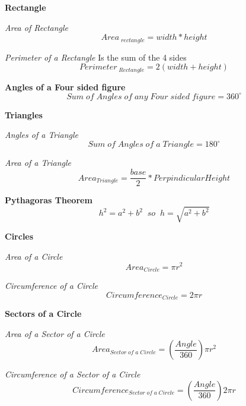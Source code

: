 \documentclass{article}
\begin{document}
\textbf{Rectangle}

\textit{Area of Rectangle}
\begin{equation}
Area_{\;rectangle} = width * height
\end{equation}

\textit{Perimeter of a Rectangle}
Is the sum of the 4 sides
\begin{equation}
Perimeter_{\;Rectangle} = 2 ( width + height )
\end{equation}

\textbf{Angles of a Four sided figure}
\begin{equation}
Sum\;of\;Angles\;of\;any\;Four\; sided\; figure = 360^\circ
\end{equation}

\textbf{Triangles}

\textit{Angles of a Triangle}
\begin{equation}
Sum\;of\;Angles\;of\;a\;Triangle = 180^\circ
\end{equation}

\textit{Area of a Triangle}
\begin{equation}
Area_{Triangle} = \frac{base}{2} * Perpindicular Height
\end{equation}

\textbf{Pythagoras Theorem}
\begin{equation}
h^2 = a^2 + b^2 \;\;so \;\;h= \sqrt{a^2 + b^2}
\end{equation}

\textbf{Circles}

\textit{Area of a Circle}
\begin{equation}
Area_{ Circle} = \pi r^ 2
\end{equation}

\textit{Circumference of a Circle}
\begin{equation}
Circumference_{ Circle} = 2 \pi r
\end{equation}

\textbf{Sectors of a Circle}

\textit{Area of a Sector of a Circle}
\begin{equation}
Area_{ Sector\;of\;a\;Circle} = \left(\frac{Angle }{ 360 }\right) \pi r^ 2
\end{equation}


\textit{Circumference of a Sector of a Circle}
\begin{equation}
Circumference_{ Sector\;of\;a\;Circle} = \left( \frac{Angle }{ 360} \right) 2 \pi r
\end{equation}
\end{document}
